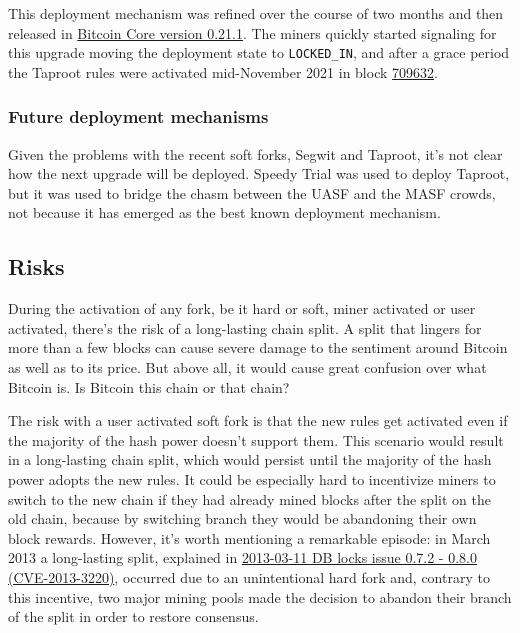 This deployment mechanism was refined over the course of two months and
then released in
\href{https://github.com/bitcoin/bitcoin/blob/master/doc/release-notes/release-notes-0.21.1.md\#taproot-soft-fork}{Bitcoin
Core version 0.21.1}. The miners quickly started signaling for this
upgrade moving the deployment state to \texttt{LOCKED\_IN}, and after a
grace period the Taproot rules were activated mid-November 2021 in block
\href{https://mempool.space/block/0000000000000000000687bca986194dc2c1f949318629b44bb54ec0a94d8244}{709632}.

\hypertarget{_future_deployment_mechanisms}{%
\subsubsection{Future deployment
mechanisms}\label{_future_deployment_mechanisms}}

Given the problems with the recent soft forks, Segwit and Taproot, it's
not clear how the next upgrade will be deployed. Speedy Trial was used
to deploy Taproot, but it was used to bridge the chasm between the UASF
and the MASF crowds, not because it has emerged as the best known
deployment mechanism.

\hypertarget{upgrading-risks}{%
\subsection{Risks}\label{upgrading-risks}}

During the activation of any fork, be it hard or soft, miner activated
or user activated, there's the risk of a long-lasting chain split. A
split that lingers for more than a few blocks can cause severe damage to
the sentiment around Bitcoin as well as to its price. But above all, it
would cause great confusion over what Bitcoin is. Is Bitcoin this chain
or that chain?

The risk with a user activated soft fork is that the new rules get
activated even if the majority of the hash power doesn't support them.
This scenario would result in a long-lasting chain split, which would
persist until the majority of the hash power adopts the new rules. It
could be especially hard to incentivize miners to switch to the new
chain if they had already mined blocks after the split on the old chain,
because by switching branch they would be abandoning their own block
rewards. However, it's worth mentioning a remarkable episode: in March
2013 a long-lasting split, explained in
\protect\hyperlink{march2013split}{2013-03-11 DB locks issue 0.7.2 -
0.8.0 (CVE-2013-3220)}, occurred due to an unintentional hard fork and,
contrary to this incentive, two major mining pools made the decision to
abandon their branch of the split in order to restore consensus.

